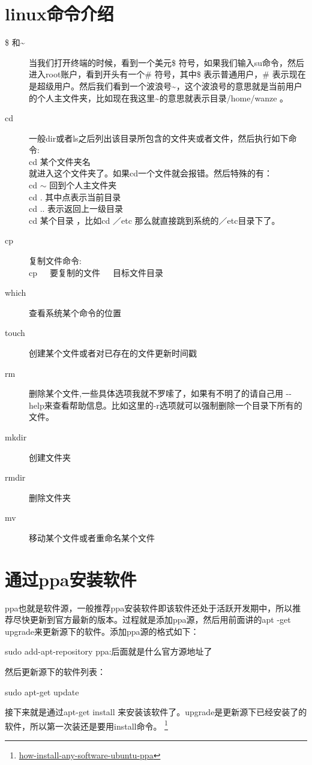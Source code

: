 \documentclass[11pt,oneside]{book}
\begin{document}
\section{linux命令介绍}
\begin{description}
\item[ \${} 和\~{}] 当我们打开终端的时候，看到一个美元\$ 符号，如果我们输入su命令，然后进入root账户，看到开头有一个\#{} 符号，其中\$ 表示普通用户，\#{} 表示现在是超级用户。然后我们看到一个波浪号\~{}，这个波浪号的意思就是当前用户的个人主文件夹，比如现在我这里\~{}的意思就表示目录/home/wanze 。
\item[ cd] 一般dir或者ls之后列出该目录所包含的文件夹或者文件，然后执行如下命令:\\cd 某个文件夹名 \\ 就进入这个文件夹了。如果cd一个文件就会报错。然后特殊的有：\\ cd $\sim$ 回到个人主文件夹\\cd . 其中点表示当前目录\\cd .. 表示返回上一级目录\\cd 某个目录 ，比如cd ／etc 那么就直接跳到系统的／etc目录下了。
\item[ cp] 复制文件命令:\\ cp~~~要复制的文件~~~目标文件目录 
\item[ which] 查看系统某个命令的位置
\item[ touch] 创建某个文件或者对已存在的文件更新时间戳
\item[ rm ]删除某个文件,一些具体选项我就不罗嗦了，如果有不明了的请自己用 -{}- help来查看帮助信息。比如这里的-r选项就可以强制删除一个目录下所有的文件。
\item[ mkdir] 创建文件夹
\item[ rmdir] 删除文件夹
\item[ mv ]移动某个文件或者重命名某个文件
\end{description}

\section{通过ppa安装软件}
ppa也就是软件源，一般推荐ppa安装软件即该软件还处于活跃开发期中，所以推荐尽快更新到官方最新的版本。过程就是添加ppa源，然后用前面讲的apt -get upgrade来更新源下的软件。添加ppa源的格式如下：
\begin{tcbbash}[]
sudo add-apt-repository ppa:后面就是什么官方源地址了
\end{tcbbash}
然后更新源下的软件列表：
\begin{tcbbash}[]
sudo apt-get update
\end{tcbbash}
接下来就是通过apt-get  install 来安装该软件了。upgrade是更新源下已经安装了的软件，所以第一次装还是要用install命令。
\footnote{\href{http://linuxers.org/howto/how-install-any-software-ubuntu-ppa}{how-install-any-software-ubuntu-ppa}}
\end{document}
